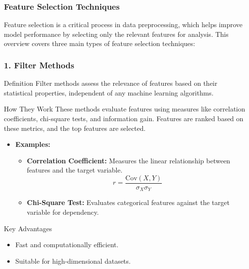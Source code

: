 \documentclass{beamer}
\begin{document}
\begin{frame}[fragile]
    \frametitle{Feature Selection Techniques}
    Feature selection is a critical process in data preprocessing, which helps improve model performance by selecting only the relevant features for analysis. This overview covers three main types of feature selection techniques:
\end{frame}

\begin{frame}[fragile]
    \frametitle{1. Filter Methods}
    \begin{block}{Definition}
        Filter methods assess the relevance of features based on their statistical properties, independent of any machine learning algorithms.
    \end{block}
    
    \begin{block}{How They Work}
        These methods evaluate features using measures like correlation coefficients, chi-square tests, and information gain. Features are ranked based on these metrics, and the top features are selected.
    \end{block}

    \begin{itemize}
        \item \textbf{Examples:}
        \begin{itemize}
            \item \textbf{Correlation Coefficient:} Measures the linear relationship between features and the target variable.
            \begin{equation}
                r = \frac{\text{Cov}(X, Y)}{\sigma_X \sigma_Y}
            \end{equation}
            \item \textbf{Chi-Square Test:} Evaluates categorical features against the target variable for dependency.
        \end{itemize}
    \end{itemize}

    \begin{block}{Key Advantages}
        \begin{itemize}
            \item Fast and computationally efficient.
            \item Suitable for high-dimensional datasets.
        \end{itemize}
    \end{block}
\end{frame}
\end{document}
